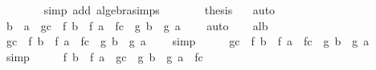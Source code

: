 \begin{isabellebody}
\ \ \ \ \ \ \isamarkupfalse%
\ {\isacharparenleft}{\kern0pt}simp\ add{\isacharcolon}{\kern0pt}\ algebra{\isacharunderscore}{\kern0pt}simps{\isacharparenright}{\kern0pt}\isanewline
\ \ \ \ \isamarkupfalse%
\ \isamarkupfalse%
\ {\isacharquery}{\kern0pt}thesis\ \ \isamarkupfalse%
\ auto\isanewline
\ \ \isamarkupfalse%
\isanewline
\ \ \isamarkupfalse%
\ \isamarkupfalse%
\ {\isachardoublequoteopen}{\isacharparenleft}{\kern0pt}b\ {\isacharminus}{\kern0pt}\ a{\isacharparenright}{\kern0pt}\ {\isacharasterisk}{\kern0pt}\ {\isacharparenleft}{\kern0pt}g{\isacharprime}{\kern0pt}c\ {\isacharasterisk}{\kern0pt}\ {\isacharparenleft}{\kern0pt}f\ b\ {\isacharminus}{\kern0pt}\ f\ a{\isacharparenright}{\kern0pt}\ {\isacharminus}{\kern0pt}\ f{\isacharprime}{\kern0pt}c\ {\isacharasterisk}{\kern0pt}\ {\isacharparenleft}{\kern0pt}g\ b\ {\isacharminus}{\kern0pt}\ g\ a{\isacharparenright}{\kern0pt}{\isacharparenright}{\kern0pt}\ {\isacharequal}{\kern0pt}\ {}{\isachardoublequoteclose}\ \isamarkupfalse%
\ auto\isanewline
\ \ \isamarkupfalse%
\ alb\ \isamarkupfalse%
\ {\isachardoublequoteopen}g{\isacharprime}{\kern0pt}c\ {\isacharasterisk}{\kern0pt}\ {\isacharparenleft}{\kern0pt}f\ b\ {\isacharminus}{\kern0pt}\ f\ a{\isacharparenright}{\kern0pt}\ {\isacharminus}{\kern0pt}\ f{\isacharprime}{\kern0pt}c\ {\isacharasterisk}{\kern0pt}\ {\isacharparenleft}{\kern0pt}g\ b\ {\isacharminus}{\kern0pt}\ g\ a{\isacharparenright}{\kern0pt}\ {\isacharequal}{\kern0pt}\ {}{\isachardoublequoteclose}\ \isamarkupfalse%
\ simp\isanewline
\ \ \isamarkupfalse%
\ \isamarkupfalse%
\ {\isachardoublequoteopen}g{\isacharprime}{\kern0pt}c\ {\isacharasterisk}{\kern0pt}\ {\isacharparenleft}{\kern0pt}f\ b\ {\isacharminus}{\kern0pt}\ f\ a{\isacharparenright}{\kern0pt}\ {\isacharequal}{\kern0pt}\ f{\isacharprime}{\kern0pt}c\ {\isacharasterisk}{\kern0pt}\ {\isacharparenleft}{\kern0pt}g\ b\ {\isacharminus}{\kern0pt}\ g\ a{\isacharparenright}{\kern0pt}{\isachardoublequoteclose}\ \isamarkupfalse%
\ simp\isanewline
\ \ \isamarkupfalse%
\ \isamarkupfalse%
\ {\isachardoublequoteopen}{\isacharparenleft}{\kern0pt}f\ b\ {\isacharminus}{\kern0pt}\ f\ a{\isacharparenright}{\kern0pt}\ {\isacharasterisk}{\kern0pt}\ g{\isacharprime}{\kern0pt}c\ {\isacharequal}{\kern0pt}\ {\isacharparenleft}{\kern0pt}g\ b\ {\isacharminus}{\kern0pt}\ g\ a{\isacharparenright}{\kern0pt}\ {\isacharasterisk}{\kern0pt}\ f{\isacharprime}{\kern0pt}c{\isachardoublequoteclose}\ \isamarkupfalse%

\end{isabellebody}
